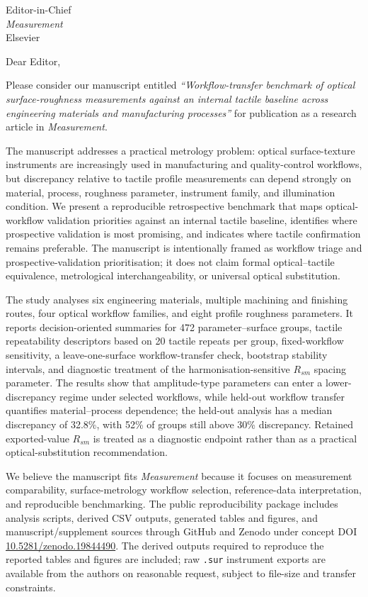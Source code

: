 \documentclass[10pt]{letter}
\begin{document}
\begin{letter}{Editor-in-Chief\\
\textit{Measurement}\\
Elsevier}

\opening{Dear Editor,}

Please consider our manuscript entitled \emph{``Workflow-transfer benchmark of optical surface-roughness measurements against an internal tactile baseline across engineering materials and manufacturing processes''} for publication as a research article in \textit{Measurement}.

The manuscript addresses a practical metrology problem: optical surface-texture instruments are increasingly used in manufacturing and quality-control workflows, but discrepancy relative to tactile profile measurements can depend strongly on material, process, roughness parameter, instrument family, and illumination condition. We present a reproducible retrospective benchmark that maps optical-workflow validation priorities against an internal tactile baseline, identifies where prospective validation is most promising, and indicates where tactile confirmation remains preferable. The manuscript is intentionally framed as workflow triage and prospective-validation prioritisation; it does not claim formal optical--tactile equivalence, metrological interchangeability, or universal optical substitution.

The study analyses six engineering materials, multiple machining and finishing routes, four optical workflow families, and eight profile roughness parameters. It reports decision-oriented summaries for 472 parameter--surface groups, tactile repeatability descriptors based on 20 tactile repeats per group, fixed-workflow sensitivity, a leave-one-surface workflow-transfer check, bootstrap stability intervals, and diagnostic treatment of the harmonisation-sensitive $R_{sm}$ spacing parameter. The results show that amplitude-type parameters can enter a lower-discrepancy regime under selected workflows, while held-out workflow transfer quantifies material--process dependence; the held-out analysis has a median discrepancy of 32.8\%, with 52\% of groups still above 30\% discrepancy. Retained exported-value $R_{sm}$ is treated as a diagnostic endpoint rather than as a practical optical-substitution recommendation.

We believe the manuscript fits \textit{Measurement} because it focuses on measurement comparability, surface-metrology workflow selection, reference-data interpretation, and reproducible benchmarking. The public reproducibility package includes analysis scripts, derived CSV outputs, generated tables and figures, and manuscript/supplement sources through GitHub and Zenodo under concept DOI \href{https://doi.org/10.5281/zenodo.19844490}{10.5281/zenodo.19844490}. The derived outputs required to reproduce the reported tables and figures are included; raw \texttt{.sur} instrument exports are available from the authors on reasonable request, subject to file-size and transfer constraints.


\end{letter}
\end{document}
